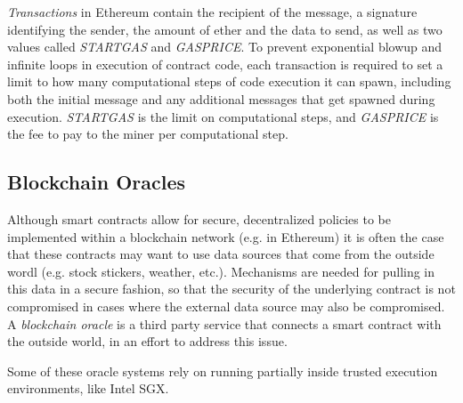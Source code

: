 \documentclass[10pt,a4paper]{article}
\begin{document}
\textit{Transactions} in Ethereum contain the recipient of the message, a signature identifying the sender, the amount of ether and the data to send, as well as two values called \textit{STARTGAS} and \textit{GASPRICE}. To prevent exponential blowup and infinite loops in execution of contract code, each transaction is required to set a limit to how many computational steps of code execution it can spawn, including both the initial message and any additional messages that get spawned during execution. \textit{STARTGAS} is the limit on computational steps, and \textit{GASPRICE} is the fee to pay to the miner per computational step. 




\subsection{Blockchain Oracles}

Although smart contracts allow for secure, decentralized policies to be implemented within a blockchain network (e.g. in Ethereum) it is often the case that these contracts may want to use data sources that come from the outside wordl (e.g. stock stickers, weather, etc.). Mechanisms are needed for pulling in this data in a secure fashion, so that the security of the underlying contract is not compromised in cases where the external data source may also be compromised. A \textit{blockchain oracle} \cite{2016towncrier,breidenbach2021chainlink} is a third party service that connects a smart contract with the outside world, in an effort to address this issue.

Some of these oracle systems \cite{2016towncrier} rely on running partially inside trusted execution environments, like Intel SGX.





\end{document}
